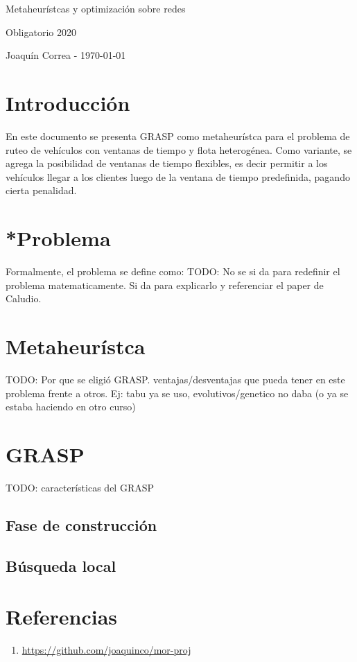 \documentclass{article}
\begin{document}
  \begin{center}
    {\sc \large Metaheurístcas y optimización sobre redes}
    
    {\sc \large Obligatorio 2020}
    \linebreak

    {\rm Joaquín Correa - \today}
  \end{center}

  \section*{Introducción}

  En este documento se presenta GRASP como metaheurístca para el problema de ruteo de vehículos con ventanas de tiempo y flota heterogénea. Como variante, se agrega la posibilidad de ventanas de tiempo flexibles, es decir permitir a los vehículos llegar a los clientes luego de la ventana de tiempo predefinida, pagando cierta penalidad.

  \section{*Problema}

  Formalmente, el problema se define como:
  TODO: No se si da para redefinir el problema matematicamente. Si da para explicarlo y referenciar el paper de Caludio.

  \section*{Metaheurístca}

  TODO: Por que se eligió GRASP. ventajas/desventajas que pueda tener en este problema frente a otros.
  Ej: tabu ya se uso, evolutivos/genetico no daba (o ya se estaba haciendo en otro curso)

  \section*{GRASP}

  TODO: características del GRASP

  \subsection*{Fase de construcción}

  \subsection*{Búsqueda local}

  \section*{Referencias}

  \begin{enumerate}
    \item{ \label{repo} \url{https://github.com/joaquinco/mor-proj}}
  \end{enumerate}
\end{document}
